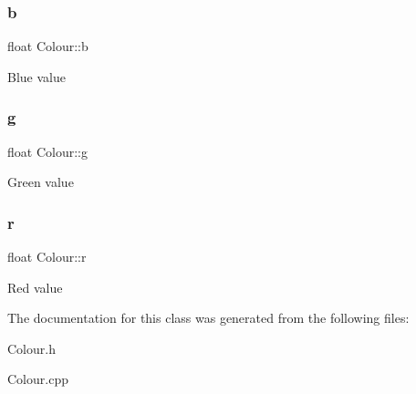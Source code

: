 \subsubsection{\texorpdfstring{b}{b}}
{\footnotesize\ttfamily float Colour\+::b}

Blue value \mbox{\label{classColour_a25bdab33ddd5f646162329bfb8b23b75}} 
\subsubsection{\texorpdfstring{g}{g}}
{\footnotesize\ttfamily float Colour\+::g}

Green value \mbox{\label{classColour_acb0b39e6e5e18b946732f51f126c8bf8}} 
\subsubsection{\texorpdfstring{r}{r}}
{\footnotesize\ttfamily float Colour\+::r}

Red value 

The documentation for this class was generated from the following files\+:\begin{DoxyCompactItemize}
\item 
Colour.\+h\item 
Colour.\+cpp\end{DoxyCompactItemize}
